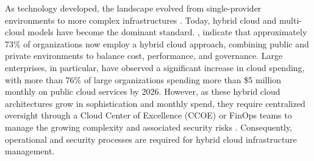 As technology developed, the landscape evolved from single-provider environments to more complex infrastructures \cite{varghese2022cloud}. Today, hybrid cloud and multi-cloud models have become the dominant standard. \cite{varghese2022cloud}, \cite{flexera2026cloud} indicate that approximately 73\% of organizations now employ a hybrid cloud approach, combining public and private environments to balance cost, performance, and governance. Large enterprises, in particular, have observed a significant increase in cloud spending, with more than 76\% of large organizations spending more than \$5 million monthly on public cloud services by 2026. However, as these hybrid cloud architectures grow in sophistication and monthly spend, they require centralized oversight through a Cloud Center of Excellence (CCOE) or FinOps teams to manage the growing complexity and associated security risks \cite{flexera2026cloud}. Consequently, operational and security processes are required for hybrid cloud infrastructure management. 
